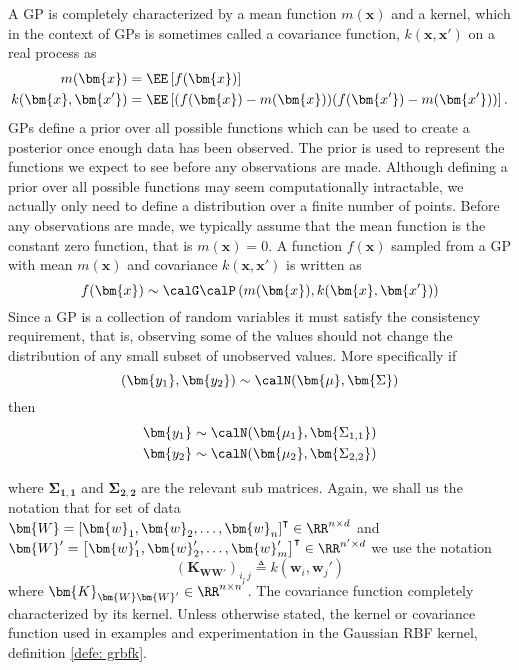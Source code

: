 A GP is completely characterized by a mean function $m(\bm{x})$ and a kernel, which in the context of GPs is sometimes called a covariance function, $k (\bm{x}, \bm{x'})$ on a real process as
\begin{align*}
    m(\bm{x})           & = \EE \left[ f(\bm{x}) \right]                                          \\
    k (\bm{x}, \bm{x'}) & = \EE \left[ (f(\bm{x}) - m(\bm{x})) (f(\bm{x'}) - m(\bm{x'})) \right].
\end{align*}
GPs define a prior over all possible functions which can be used to create a posterior once enough data has been observed. The prior is used to represent the functions we expect to see before any observations are made. Although defining a prior over all possible functions may seem computationally intractable, we actually only need to define a distribution over a finite number of points. Before any observations are made, we typically assume that the mean function is the constant zero function, that is $m \left( \bm{x} \right) = 0$. A function $f(\bm{x})$ sampled from a GP with mean $m(\bm{x})$ and covariance $k (\bm{x}, \bm{x'})$ is written as
\[
    f(\bm{x}) \sim \calG \calP \left( m(\bm{x}), k (\bm{x}, \bm{x'}) \right)
\]
Since a GP is a collection of random variables it must satisfy the consistency requirement, that is, observing some of the values should not change the distribution of any small subset of unobserved values. More specifically if
\[
    (\bm{y_1}, \bm{y_2}) \sim \calN (\bm{\mu}, \bm{\Sigma})
\]
then
\begin{align*}
    \bm{y_1} & \sim \calN (\bm{\mu_1}, \bm{\Sigma_{1,1}}) \\
    \bm{y_2} & \sim \calN (\bm{\mu_2}, \bm{\Sigma_{2,2}})
\end{align*}

where $\bm{\Sigma_{1,1}}$ and $\bm{\Sigma_{2,2}}$ are the relevant sub matrices. Again, we shall us the notation that for set of data $\bm{W} = \left[ \bm{w}_1 ,\bm{w}_2 , \ldots , \bm{w}_n \right]^{\intercal} \in \RR^{n \times d}$ and $\bm{W}' = \left[ \bm{w}_1' ,\bm{w}_2' , \ldots , \bm{w}_m' \right]^{\intercal} \in \RR^{n' \times d}$ we use the notation
\[
    \left( \bm{K}_{\bm{W} \bm{W}'} \right)_{i,j} \triangleq k \left( \bm{w}_i , \bm{w}_j' \right)
\]
where \( \bm{K}_{\bm{W} \bm{W}'} \in \RR^{n \times n'} \). The covariance function completely characterized by its kernel. Unless otherwise stated, the kernel or covariance function used in examples and experimentation in the Gaussian RBF kernel, definition \ref{defe: grbfk}.


